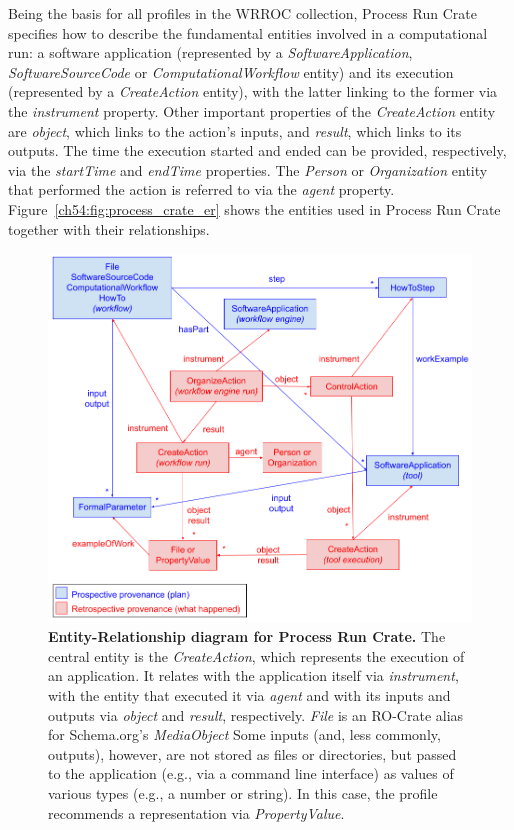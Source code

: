Being the basis for all profiles in the WRROC collection, Process Run Crate specifies how to describe the fundamental entities involved in a computational run: a software application (represented by a
\emph{SoftwareApplication}, \emph{SoftwareSourceCode} or
\emph{ComputationalWorkflow} entity) and its execution (represented by a \emph{CreateAction} entity), with the latter linking to the former via the \emph{instrument} property.
Other important properties of the
\emph{CreateAction} entity are \emph{object}, which links to the action's inputs, and \emph{result}, which links to its outputs.
The time the execution started and ended can be provided, respectively, via the
\emph{startTime} and \emph{endTime} properties.
The \emph{Person} or
\emph{Organization} entity that performed the action is referred to via the \emph{agent} property.
Figure~\vref{ch54:fig:process_crate_er} shows the entities used in Process Run Crate together with their relationships.

\begin{figure}[!ht]
\includegraphics[width=\textwidth]{figures/ch54/image1.png}
\caption{{\bf Entity-Relationship diagram for Process Run Crate.}
The central entity is the \emph{CreateAction}, which represents the execution of an application.
It relates with the application itself via \emph{instrument}, with the entity that executed it via \emph{agent} and with its inputs and outputs via \emph{object}
and \emph{result}, respectively. 
\emph{File} is an RO-Crate alias for Schema.org's \emph{MediaObject}
Some inputs (and, less commonly, outputs), however, are not stored as files or directories, but passed to the application (e.g., via a command line interface) as values of various types (e.g., a number or string). In this case, the profile recommends a representation via \emph{PropertyValue}. 
}
\label{ch54:fig:process_crate_er}
\end{figure}

